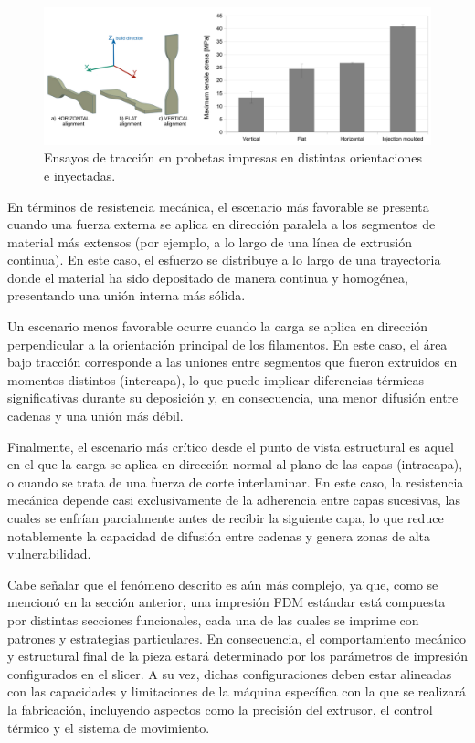 \begin{figure}[h!]
	\centering
	\includegraphics[width=1.0\linewidth]{imgs/streng.png}
	\caption{Ensayos de tracción en probetas impresas en distintas orientaciones e inyectadas. \cite{strenb}}
	\label{strengsfig}
\end{figure}

En términos de resistencia mecánica, el escenario más favorable se presenta cuando una fuerza externa se aplica en dirección paralela a los segmentos de material más extensos (por ejemplo, a lo largo de una línea de extrusión continua). En este caso, el esfuerzo se distribuye a lo largo de una trayectoria donde el material ha sido depositado de manera continua y homogénea, presentando una unión interna más sólida.

Un escenario menos favorable ocurre cuando la carga se aplica en dirección perpendicular a la orientación principal de los filamentos. En este caso, el área bajo tracción corresponde a las uniones entre segmentos que fueron extruidos en momentos distintos (intercapa), lo que puede implicar diferencias térmicas significativas durante su deposición y, en consecuencia, una menor difusión entre cadenas y una unión más débil.

Finalmente, el escenario más crítico desde el punto de vista estructural es aquel en el que la carga se aplica en dirección normal al plano de las capas (intracapa), o cuando se trata de una fuerza de corte interlaminar. En este caso, la resistencia mecánica depende casi exclusivamente de la adherencia entre capas sucesivas, las cuales se enfrían parcialmente antes de recibir la siguiente capa, lo que reduce notablemente la capacidad de difusión entre cadenas y genera zonas de alta vulnerabilidad.

Cabe señalar que el fenómeno descrito es aún más complejo, ya que, como se mencionó en la sección anterior, una impresión FDM estándar está compuesta por distintas secciones funcionales, cada una de las cuales se imprime con patrones y estrategias particulares. En consecuencia, el comportamiento mecánico y estructural final de la pieza estará determinado por los parámetros de impresión configurados en el slicer. A su vez, dichas configuraciones deben estar alineadas con las capacidades y limitaciones de la máquina específica con la que se realizará la fabricación, incluyendo aspectos como la precisión del extrusor, el control térmico y el sistema de movimiento.

